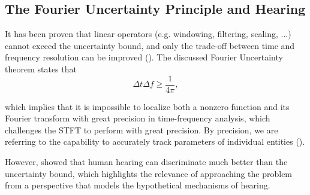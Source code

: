 








\subsection{The Fourier Uncertainty Principle and Hearing}
\label{sec:beatingFourier}

It has been proven that linear operators (e.g. windowing, filtering, scaling, ...) cannot exceed the uncertainty bound, and only the trade-off between time and frequency resolution can be improved (\cite{theodor_time-frequency_1997}). The discussed Fourier Uncertainty theorem states that 
\begin{equation}
    \Delta t \Delta f \geq \frac{1}{4 \pi},
\end{equation}

which implies that it is impossible to localize both a nonzero function and its Fourier transform with great precision in time-frequency analysis, which challenges the STFT to perform with great precision. By precision, we are referring to the capability to accurately track parameters of individual entities (\cite{dubey_fourier_2021, oppenheim_human_2013}).

However, \textcite{oppenheim_human_2013} showed that human hearing can discriminate much better than the uncertainty bound, which highlights the relevance of approaching the problem from a perspective that models the hypothetical mechanisms of hearing. 

